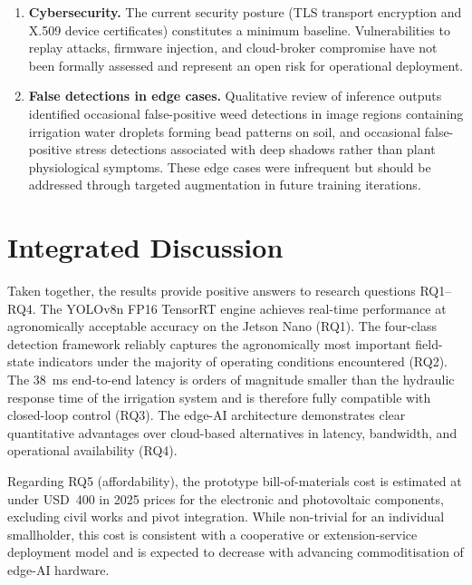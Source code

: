 \documentclass[12pt,a4paper]{report}
\begin{document}
\begin{enumerate}[label=\textbf{L\arabic*.}]
    \item \textbf{Cybersecurity.} The current security posture (TLS transport encryption and X.509 device certificates) constitutes a minimum baseline. Vulnerabilities to replay attacks, firmware injection, and cloud-broker compromise have not been formally assessed and represent an open risk for operational deployment.

    \item \textbf{False detections in edge cases.} Qualitative review of inference outputs identified occasional false-positive weed detections in image regions containing irrigation water droplets forming bead patterns on soil, and occasional false-positive stress detections associated with deep shadows rather than plant physiological symptoms. These edge cases were infrequent but should be addressed through targeted augmentation in future training iterations.
\end{enumerate}

\section{Integrated Discussion}

Taken together, the results provide positive answers to research questions RQ1--RQ4. The YOLOv8n FP16 TensorRT engine achieves real-time performance at agronomically acceptable accuracy on the Jetson Nano (RQ1). The four-class detection framework reliably captures the agronomically most important field-state indicators under the majority of operating conditions encountered (RQ2). The 38~ms end-to-end latency is orders of magnitude smaller than the hydraulic response time of the irrigation system and is therefore fully compatible with closed-loop control (RQ3). The edge-AI architecture demonstrates clear quantitative advantages over cloud-based alternatives in latency, bandwidth, and operational availability (RQ4).

Regarding RQ5 (affordability), the prototype bill-of-materials cost is estimated at under USD~400 in 2025 prices for the electronic and photovoltaic components, excluding civil works and pivot integration. While non-trivial for an individual smallholder, this cost is consistent with a cooperative or extension-service deployment model and is expected to decrease with advancing commoditisation of edge-AI hardware.

\end{document}
